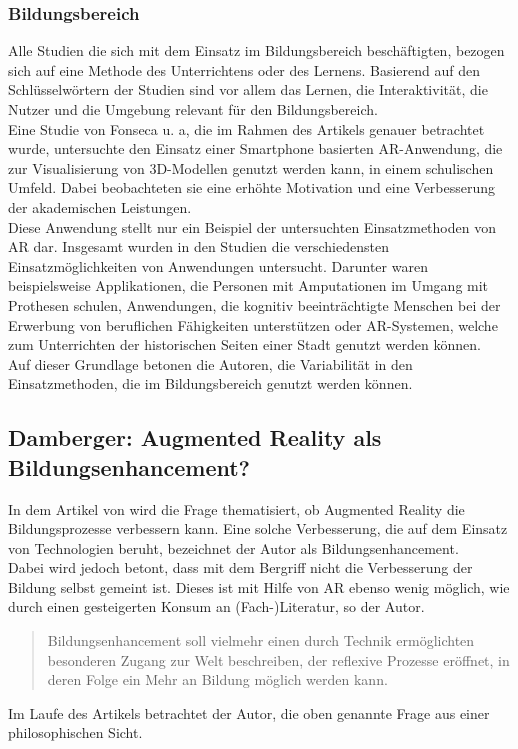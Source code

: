 \subsubsection{Bildungsbereich}
Alle Studien die sich mit dem Einsatz im Bildungsbereich beschäftigten, bezogen sich auf eine Methode des Unterrichtens oder des Lernens. Basierend auf den Schlüsselwörtern der Studien sind vor allem das Lernen, die Interaktivität, die Nutzer und die Umgebung relevant für den Bildungsbereich.\\
Eine Studie von Fonseca u. a, die im Rahmen des Artikels genauer betrachtet wurde, untersuchte den Einsatz einer Smartphone basierten AR-Anwendung, die zur Visualisierung von 3D-Modellen genutzt werden kann, in einem schulischen Umfeld. Dabei beobachteten sie eine erhöhte Motivation und eine Verbesserung der akademischen Leistungen. \\
Diese Anwendung stellt nur ein Beispiel der untersuchten Einsatzmethoden von AR dar. Insgesamt wurden in den Studien die verschiedensten Einsatzmöglichkeiten von Anwendungen untersucht. Darunter waren beispielsweise Applikationen, die Personen mit Amputationen im Umgang mit Prothesen schulen, Anwendungen, die kognitiv beeinträchtigte Menschen bei der Erwerbung von beruflichen Fähigkeiten unterstützen oder AR-Systemen, welche zum Unterrichten der historischen Seiten einer Stadt genutzt werden können. \\
Auf dieser Grundlage betonen die Autoren, die Variabilität in den Einsatzmethoden, die im Bildungsbereich genutzt werden können. \citep[Kapitel 4.2]{dey:review-of-ar-studies}


\subsection{Damberger: Augmented Reality als Bildungsenhancement?}
In dem Artikel \citep{damberger:ar-bildungsenhancement} von \citeauthor{damberger:ar-bildungsenhancement} wird die Frage thematisiert, ob Augmented Reality die Bildungsprozesse verbessern kann. Eine solche Verbesserung, die auf dem Einsatz von Technologien beruht, bezeichnet der Autor als Bildungsenhancement. \\
Dabei wird jedoch betont, dass mit dem Bergriff nicht die Verbesserung der Bildung selbst gemeint ist. Dieses ist mit Hilfe von AR ebenso wenig möglich, wie durch einen gesteigerten Konsum an (Fach-)Literatur, so der Autor.
\begin{quote}
\glqq Bildungsenhancement soll vielmehr einen durch Technik ermöglichten besonderen Zugang zur Welt beschreiben, der reflexive Prozesse eröffnet, in deren Folge ein Mehr an Bildung möglich werden kann.\grqq \citep[S. 5]{damberger:ar-bildungsenhancement}
\end{quote}
Im Laufe des Artikels betrachtet der Autor, die oben genannte Frage aus einer philosophischen Sicht.

